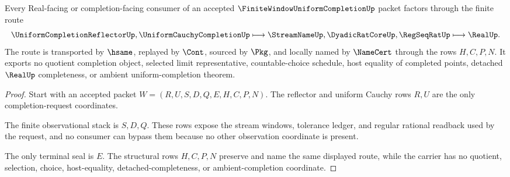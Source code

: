 \begin{theorem}
\label{thm:finite-window-uniform-completion-nonescape}
Every Real-facing or completion-facing consumer of an accepted $\FiniteWindowUniformCompletionUp$ packet factors through the finite route
$$
\UniformCompletionReflectorUp,\UniformCauchyCompletionUp
\longmapsto
\StreamNameUp,\DyadicRatCoreUp,\RegSeqRatUp
\longmapsto
\RealUp .
$$
The route is transported by $\hsame$, replayed by $\Cont$, sourced by $\Pkg$, and locally named by $\NameCert$ through the rows $H,C,P,N$. It exports no quotient completion object, selected limit representative, countable-choice schedule, host equality of completed points, detached $\RealUp$ completeness, or ambient uniform-completion theorem.
\end{theorem}
\begin{proof}
Start with an accepted packet $W=(R,U,S,D,Q,E,H,C,P,N)$. The reflector and uniform Cauchy rows $R,U$ are the only completion-request coordinates.

The finite observational stack is $S,D,Q$. These rows expose the stream windows, tolerance ledger, and regular rational readback used by the request, and no consumer can bypass them because no other observation coordinate is present.

The only terminal seal is $E$. The structural rows $H,C,P,N$ preserve and name the same displayed route, while the carrier has no quotient, selection, choice, host-equality, detached-completeness, or ambient-completion coordinate.
\end{proof}




